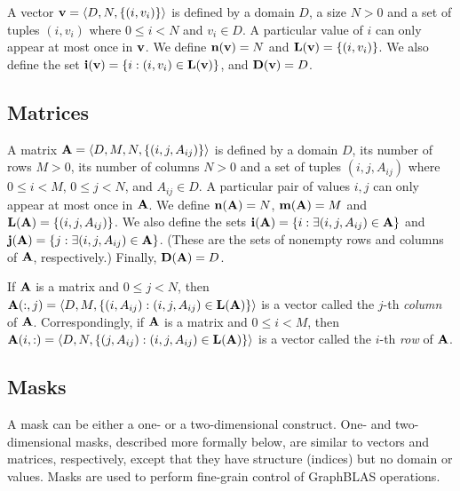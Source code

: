 A vector ${\bf v} = \langle D, N, \{ (i,v_i) \} \rangle$ is defined
by a domain $D$, a size $N>0$ and a set of tuples $(i,v_i)$ where
$0 \leq i < N$ and $v_i \in D$. A particular value of $i$ can only
appear at most once in ${\bf v}$. We define $\bold{n}({\bf v}) =
N$ and $\bold{L}({\bf v}) = \{ (i,v_i) \}$. We also define the set
${\bf i({\bf v})} = \{ i : (i,v_i) \in \bold{L}({\bf v}) \}$,
and $\bold{D}({\bf v}) = D$.

\subsection{Matrices}
\label{Sec:Matrices}

A matrix ${\bf A} = \langle D, M, N, \{ (i,j,A_{ij}) \} \rangle$ is
defined by a domain $D$, its number of rows $M>0$, its number of columns
$N>0$ and a set of tuples $(i,j,A_{ij})$ where $0 \leq i < M$, $0 \leq
j < N$, and $A_{ij} \in D$. A particular pair of values $i,j$ can only
appear at most once in ${\bf A}$. We define $\bold{n}({\bf A})
= N$,  $\bold{m}({\bf A}) = M$ and $\bold{L}({\bf A}) = \{
(i,j,A_{ij}) \}$.  We also define the sets ${\bf i({\bf A})} = \{
i : \exists (i,j,A_{ij}) \in {\bf A} \}$ and ${\bf j({\bf A})}
= \{ j : \exists (i,j,A_{ij}) \in {\bf A} \}$.  (These are the sets
of nonempty rows and columns of ${\bf A}$, respectively.)  Finally,
$\bold{D}({\bf A}) = D$.

If ${\bf A}$ is a matrix and $0 \leq j < N$, then ${\bf A}(:,j)
= \langle D, M, \{(i,A_{ij}) : (i,j,A_{ij}) \in \bold{L}({\bf A})
\} \rangle$ is a vector called the $j$-th \emph{column}
of ${\bf A}$. Correspondingly, if ${\bf A}$ is a matrix and
$0 \leq i < M$, then ${\bf A}(i,:) = \langle D, N, \{(j,A_{ij}) :
(i,j,A_{ij}) \in \bold{L}({\bf A}) \} \rangle$ is a vector called
the $i$-th \emph{row} of ${\bf A}$.

\subsection{Masks}
\label{Sec:Masks}


A mask can be either a one- or a two-dimensional construct.
One- and two-dimensional masks, described more formally below, are
similar to vectors and matrices, respectively, except that they have
structure (indices) but no domain or values.
Masks are used to perform fine-grain control of GraphBLAS operations.

